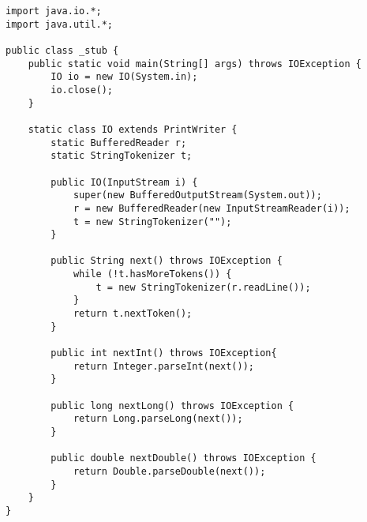 \begin{verbatim}
import java.io.*;
import java.util.*;

public class _stub {
	public static void main(String[] args) throws IOException {
		IO io = new IO(System.in);
		io.close();
	}

	static class IO extends PrintWriter {
		static BufferedReader r;
		static StringTokenizer t;

		public IO(InputStream i) {
			super(new BufferedOutputStream(System.out));
			r = new BufferedReader(new InputStreamReader(i));
			t = new StringTokenizer("");
		}

		public String next() throws IOException {
			while (!t.hasMoreTokens()) {
				t = new StringTokenizer(r.readLine());
			}
			return t.nextToken();
		}

		public int nextInt() throws IOException{
			return Integer.parseInt(next());
		}

		public long nextLong() throws IOException {
			return Long.parseLong(next());
		}

		public double nextDouble() throws IOException {
			return Double.parseDouble(next());
		}
	}
}
\end{verbatim}